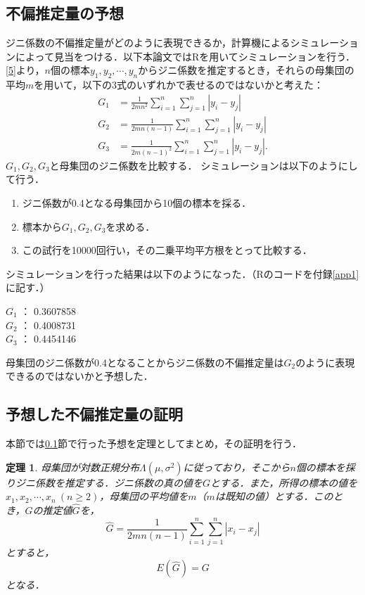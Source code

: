 \documentclass{jsarticle}
\newtheorem{thm}[dfn]{定理}
\begin{document}
\subsection{不偏推定量の予想}\label{yosou}
ジニ係数の不偏推定量がどのように表現できるか，計算機によるシミュレーションによって見当をつける．以下本論文ではRを用いてシミュレーションを行う．\eqref{5}より，$n$個の標本$y_1,y_2,\dotsb,y_n$からジニ係数を推定するとき，それらの母集団の平均$m$を用いて，以下の3式のいずれかで表せるのではないかと考えた：
\begin{align*}
G_1&=\frac{1}{2mn^2} \sum_{i=1}^n \sum_{j=1}^n |y_i-y_j| \\
G_2&=\frac{1}{2mn(n-1)} \sum_{i=1}^n \sum_{j=1}^n |y_i-y_j| \\
G_3&=\frac{1}{2m(n-1)^2} \sum_{i=1}^n \sum_{j=1}^n |y_i-y_j|. 
\end{align*}
$G_1,G_2,G_3$と母集団のジニ係数を比較する．
シミュレーションは以下のようにして行う．
\begin{enumerate}
\item ジニ係数が0.4となる母集団から10個の標本を採る．
\item 標本から$G_1,G_2,G_3$を求める．
\item この試行を10000回行い，その二乗平均平方根をとって比較する．
\end{enumerate}
シミュレーションを行った結果は以下のようになった．（Rのコードを付録\ref{app1}に記す．）
\begin{center}
$G_1$ ： 0.3607858 \\
$G_2$ ： 0.4008731 \\
$G_3$ ： 0.4454146 \\
\end{center}
母集団のジニ係数が0.4となることからジニ係数の不偏推定量は$G_2$のように表現できるのではないかと予想した．


\subsection{予想した不偏推定量の証明}
本節では\ref{yosou}節で行った予想を定理としてまとめ，その証明を行う．
\begin{thm}
母集団が対数正規分布$\Lambda(\mu, \sigma^2)$に従っており，そこから$n$個の標本を採りジニ係数を推定する．ジニ係数の真の値を$G$とする．また，所得の標本の値を$x_1,x_2,\dotsb,x_n\ (n\geq 2)$，母集団の平均値を$m$（$m$は既知の値）とする．このとき，$G$の推定値$\hat{G}$を，
\[ \hat{G}=\frac{1}{2mn(n-1)} \sum_{i=1}^n \sum_{j=1}^n |x_i-x_j| \]
とすると，
\[ E(\hat{G})=G \]
となる．
\end{thm}
\end{document}
